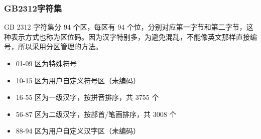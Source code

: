 \begin{frame}
    \frametitle{GB2312字符集 }
    GB 2312 字符集分 94 个区，每区有 94 个位，分别对应第一字节和第二字节，这种表示方式也称为区位码。因为汉字特别多，为避免混乱，不能像英文那样直接编号，所以采用分区管理的方法。

    \begin{itemize}
      \item 01-09 区为特殊符号
      \item 10-15 区为用户自定义符号区（未编码）
      \item 16-55 区为一级汉字，按拼音排序，共 3755 个
      \item 56-87 区为二级汉字，按部首/笔画排序，共 3008 个
      \item 88-94 区为用户自定义汉字区（未编码）
    \end{itemize}
\end{frame}

